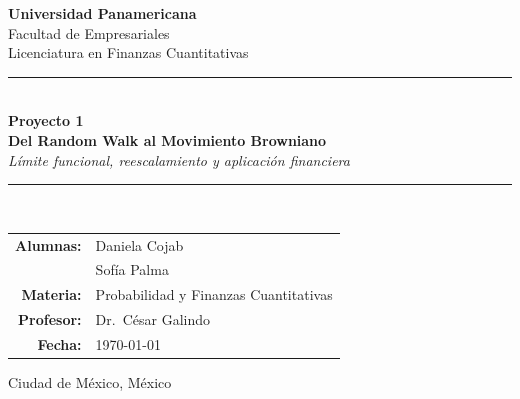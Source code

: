 \documentclass[12pt, a4paper]{article}
\begin{document}

\begin{titlepage}
\centering
\vspace*{1.5cm}

{\Large\textbf{Universidad Panamericana}}\\[0.3cm]
{\large Facultad de Empresariales}\\[0.2cm]
{\large Licenciatura en Finanzas Cuantitativas}\\[2.0cm]

\rule{\linewidth}{1.5pt}\\[0.5cm]
{\LARGE\textbf{Proyecto 1}}\\[0.4cm]
{\Large\textbf{Del Random Walk al Movimiento Browniano}}\\[0.3cm]
{\large\textit{Límite funcional, reescalamiento y aplicación financiera}}\\[0.2cm]
\rule{\linewidth}{1.5pt}\\[2.0cm]

\begin{tabular}{rl}
\textbf{Alumnas:}  & Daniela Cojab \\
                   & Sofía Palma \\[0.3cm]
\textbf{Materia:}  & Probabilidad y Finanzas Cuantitativas \\[0.3cm]
\textbf{Profesor:} & Dr.\ César Galindo \\[0.3cm]
\textbf{Fecha:}    & \today \\
\end{tabular}

\vfill
{\small Ciudad de México, México}
\end{titlepage}

\begin{abstract}
\noindent
Este informe responde la pregunta central del Proyecto~1: ¿cómo se observa
en simulación el paso de una caminata aleatoria reescalada a un proceso tipo
browniano? Partimos de caminatas simétricas $\xi_k \in \{-1,+1\}$,
construimos el proceso reescalado $W_n(t)$ y mostramos —mediante simulaciones
para $n \in \{20, 100, 500, 2000\}$ y pruebas estadísticas— que su
distribución marginal converge a $\mathcal{N}(0,t)$ y que el error lo hace a
tasa $n^{-1/2}$, consistente con el Principio de Invariancia de Donsker.
Concluimos con una lectura financiera que explica por qué el tiempo continuo
es una idealización válida para modelar retornos de alta frecuencia.
\end{abstract}
\end{document}
